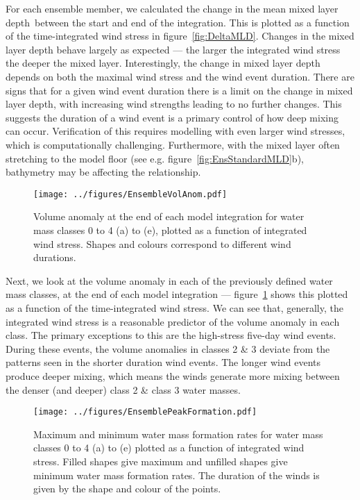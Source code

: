 For each ensemble member, we calculated the change in the mean mixed layer depth\footnotemark\ between the start and end of the integration. This is plotted as a function of the time-integrated wind stress in figure~\ref{fig:DeltaMLD}. Changes in the mixed layer depth behave largely as expected --- the larger the integrated wind stress the deeper the mixed layer. Interestingly, the change in mixed layer depth depends on both the maximal wind stress and the wind event duration. There are signs that for a given wind event duration there is a limit on the change in mixed layer depth, with increasing wind strengths leading to no further changes. This suggests the duration of a wind event is a primary control of how deep mixing can occur. Verification of this requires modelling with even larger wind stresses, which is computationally challenging. Furthermore, with the mixed layer often stretching to the model floor (see e.g. figure~\ref{fig:EnsStandardMLD}b), bathymetry may be affecting the relationship.

\begin{figure}[p]
    \centering
    \texttt{[image: ../figures/EnsembleVolAnom.pdf]}
    \caption{Volume anomaly at the end of each model integration for water mass classes 0 to 4 (a) to (e), plotted as a function of integrated wind stress. Shapes and colours correspond to different wind durations.}
    \label{fig:EnsVolAnom}
\end{figure}

Next, we look at the volume anomaly in each of the previously defined water mass classes, at the end of each model integration --- figure~\ref{fig:EnsVolAnom} shows this plotted as a function of the time-integrated wind stress. We can see that, generally, the integrated wind stress is a reasonable predictor of the volume anomaly in each class. The primary exceptions to this are the high-stress five-day wind events. During these events, the volume anomalies in classes 2 \& 3 deviate from the patterns seen in the shorter duration wind events. The longer wind events produce deeper mixing, which means the winds generate more mixing between the denser (and deeper) class 2 \& class 3 water masses.

\begin{figure}[p]
    \centering
    \texttt{[image: ../figures/EnsemblePeakFormation.pdf]}
    \caption{Maximum and minimum water mass formation rates for water mass classes 0 to 4 (a) to (e) plotted as a function of integrated wind stress. Filled shapes give maximum and unfilled shapes give minimum water mass formation rates. The duration of the winds is given by the shape and colour of the points.}
    \label{fig:EnsPkFormation}
\end{figure}

